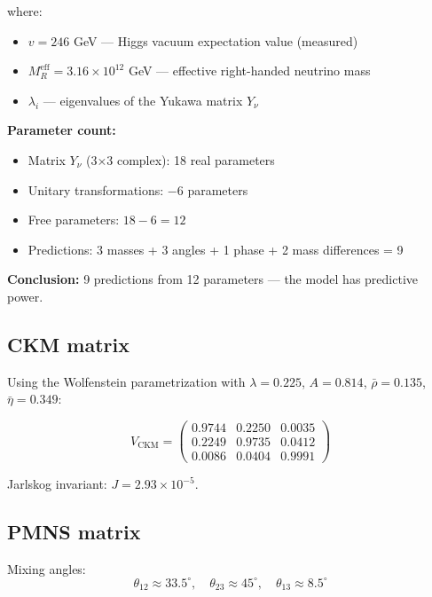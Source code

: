 \documentclass[12pt,a4paper,twoside]{article}
\newcommand{\CKM}{V_{\text{CKM}}}
\theoremstyle{definition}
\begin{document}
where:
\begin{itemize}
    \item $v = 246$ GeV — Higgs vacuum expectation value (measured)
    \item $M_R^{\text{eff}} = 3.16\times10^{12}$ GeV — effective right-handed neutrino mass
    \item $\lambda_i$ — eigenvalues of the Yukawa matrix $Y_\nu$
\end{itemize}

\textbf{Parameter count:}
\begin{itemize}
    \item Matrix $Y_\nu$ (3×3 complex): 18 real parameters
    \item Unitary transformations: $-6$ parameters
    \item Free parameters: $18 - 6 = 12$
    \item Predictions: 3 masses + 3 angles + 1 phase + 2 mass differences = 9
\end{itemize}

\textbf{Conclusion:} 9 predictions from 12 parameters — the model has predictive power.

\subsection{CKM matrix}

Using the Wolfenstein parametrization with $\lambda = 0.225$, $A = 0.814$, $\bar{\rho} = 0.135$, $\bar{\eta} = 0.349$:

\begin{equation}
\CKM = \begin{pmatrix}
0.9744 & 0.2250 & 0.0035 \\
0.2249 & 0.9735 & 0.0412 \\
0.0086 & 0.0404 & 0.9991
\end{pmatrix}
\label{eq:ckm}
\end{equation}

Jarlskog invariant: $J = 2.93 \times 10^{-5}$.

\subsection{PMNS matrix}

Mixing angles:
\begin{equation}
\theta_{12} \approx 33.5^\circ, \quad \theta_{23} \approx 45^\circ, \quad \theta_{13} \approx 8.5^\circ
\label{eq:pmns_angles}
\end{equation}
\end{document}
